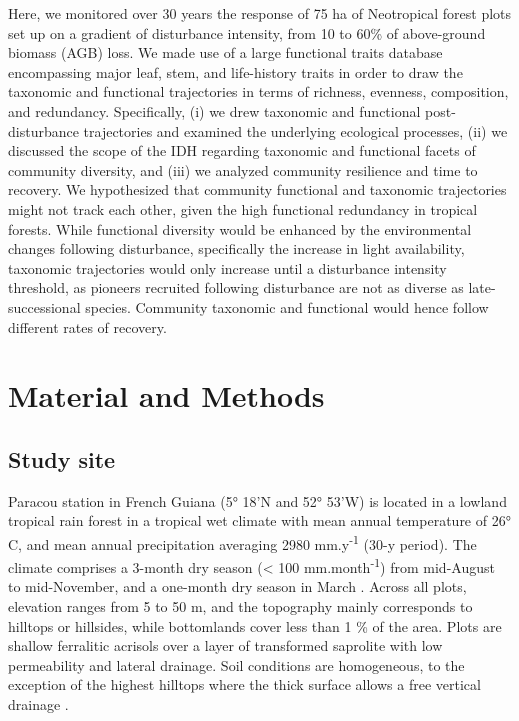 \documentclass[fleqn,10pt]{ArtEcoFoG} %
\begin{document}
Here, we monitored over 30 years the response of 75 ha of Neotropical
forest plots set up on a gradient of disturbance intensity, from 10 to
60\% of above-ground biomass (AGB) loss. We made use of a large
functional traits database encompassing major leaf, stem, and
life-history traits in order to draw the taxonomic and functional
trajectories in terms of richness, evenness, composition, and
redundancy. Specifically, (i) we drew taxonomic and functional
post-disturbance trajectories and examined the underlying ecological
processes, (ii) we discussed the scope of the IDH regarding taxonomic
and functional facets of community diversity, and (iii) we analyzed
community resilience and time to recovery. \color{red} We hypothesized
that community functional and taxonomic trajectories might not track
each other, given the high functional redundancy in tropical forests.
While functional diversity would be enhanced by the environmental
changes following disturbance, specifically the increase in light
availability, taxonomic trajectories would only increase until a
disturbance intensity threshold, as pioneers recruited following
disturbance are not as diverse as late-successional species. Community
taxonomic and functional would hence follow different rates of recovery.
\color{black}

\section{Material and Methods}\label{material-and-methods}

\subsection{Study site}\label{study-site}

Paracou station in French Guiana (5° 18'N and 52° 53'W) is located in a
lowland tropical rain forest in a tropical wet climate with mean annual
temperature of 26° C, and mean annual precipitation averaging 2980
mm.y\textsuperscript{-1} (30-y period). The climate comprises a 3-month
dry season (\textless{} 100 mm.month\textsuperscript{-1}) from
mid-August to mid-November, and a one-month dry season in March
\citep{Wagner2011}. Across all plots, elevation ranges from 5 to 50 m,
and the topography mainly corresponds to hilltops or hillsides, while
bottomlands cover less than 1 \% of the area. Plots are shallow
ferralitic acrisols over a layer of transformed saprolite with low
permeability and lateral drainage. Soil conditions are homogeneous, to
the exception of the highest hilltops where the thick surface allows a
free vertical drainage \citep{Gourlet-Fleury2004}.
\end{document}
